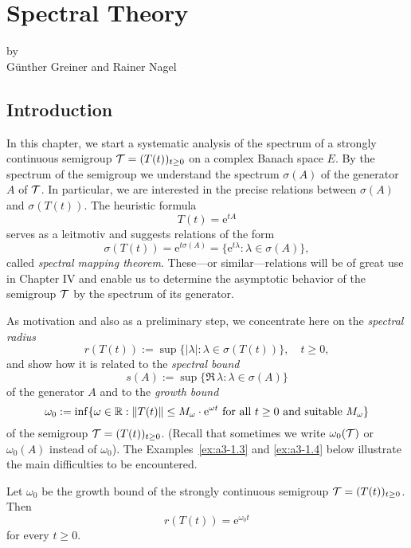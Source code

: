 \chapter{Spectral Theory}\label{chap:a3}
{\Large
\vspace*{-.75cm}
by \\[.25em]
Günther Greiner and Rainer Nagel 
\vspace{.75cm}
\\
}
\section{Introduction}
In this chapter, we start a systematic analysis of the spectrum of a strongly continuous semigroup $\mathcal{T} = (T(t))_{t\geq 0}$ on a complex Banach space $E$.
By the spectrum of the semigroup we understand the spectrum $\sigma(A)$ of the generator $A$ of $\mathcal{T}$.
In particular, we are interested in the precise relations between $\sigma(A)$ and $\sigma(T(t))$.
The heuristic formula
\[
	T(t) = \mathrm{e}^{tA}
\]
serves as a leitmotiv and suggests relations of the form
\[
\sigma(T(t)) = \mathrm{e}^{t\sigma(A)} = \{ \mathrm{e}^{t\lambda} \colon \lambda \in \sigma(A) \} ,
\]
called \emph{spectral mapping theorem}.
These---or similar---relations will be of great use in Chapter IV and enable us to determine the asymptotic behavior of the semigroup $\mathcal{T}$ by the spectrum of its generator.

As motivation and also as a preliminary step, we concentrate here on the \emph{spectral radius}
\begin{equation}\label{eq:a3-1.1}
	r(T(t)) := \sup \{ |\lambda| : \lambda \in \sigma(T(t)) \}, \quad t \geq 0 ,
\end{equation}
and show how it is related to the \emph{spectral bound}
\begin{equation}\label{eq:a3-1.2}
	s(A) := \sup \{ \Re\,\lambda : \lambda \in \sigma(A) \}
\end{equation}
of the generator $A$ and to the \emph{growth bound}
\begin{equation}\label{eq:a3-1.3}
	\omega_{0} := \inf \{\omega \in \mathbb{R}  : \|T(t)\| \leq M_{\omega}\cdot \mathrm{e}^{\omega t} \text{ for all } t \geq 0 \text{ and suitable } M_{\omega}\}
\end{equation}
of the semigroup $\mathcal{T} = (T(t))_{t\geq 0}$.
(Recall that sometimes we write $\omega_{0}(\mathcal{T})$ or $\omega_{0}(A)$ instead of $\omega_{0}$).
%
The Examples~\ref{ex:a3-1.3} and \ref{ex:a3-1.4} below illustrate the main difficulties to be encountered.
\begin{proposition}\label{prop:a3-1.1}
Let $\omega_{0}$ be the growth bound of the strongly continuous semigroup $\mathcal{T} = (T(t))_{t\geq 0}$.
Then
\begin{equation}\label{eq:a3-1.4}
	r(T(t)) = \mathrm{e}^{\omega_{0} t}
\end{equation}
for every $t \geq 0$.
\end{proposition}

